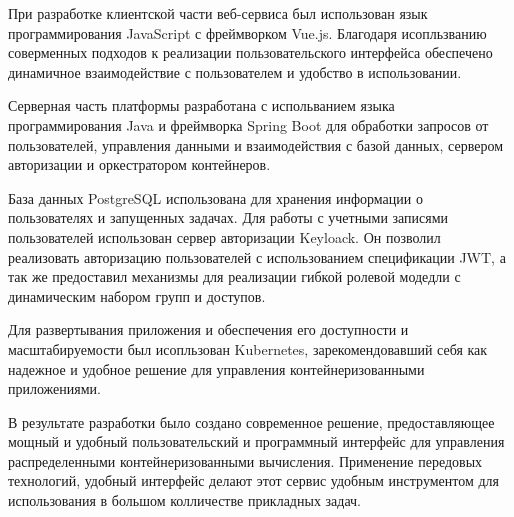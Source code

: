 При разработке клиентской части веб-сервиса был использован язык программирования JavaScript с фреймворком Vue.js.  Благодаря исопльзванию соверменных подходов к реализации пользовательского интерфейса обеспечено динамичное взаимодействие с пользователем и удобство в использовании.

Серверная часть платформы разработана с испольванием языка программирования Java и фреймворка Spring Boot для обработки запросов от пользователей, управления данными и взаимодействия с базой данных, сервером авторизации и оркестратором контейнеров.

База данных PostgreSQL использована для хранения информации о пользователях и запущенных задачах. Для работы с учетными записями пользователей использован сервер авторизации Keyloack. Он позволил реализовать авторизацию пользователей с использованием спецификации JWT, а так же предоставил механизмы для реализации гибкой ролевой модедли с динамическим набором групп и доступов.

Для развертывания приложения и обеспечения его доступности и масштабируемости был исопльзован Kubernetes, зарекомендовавший себя как надежное и удобное решение для управления контейнеризованными приложениями.

В результате разработки было создано современное решение, предоставляющее мощный и удобный пользовательский и программный интерфейс для управления распределенными контейнеризованными вычисления. Применение передовых технологий, удобный интерфейс делают этот сервис удобным инструментом для использования в большом колличестве прикладных задач. 